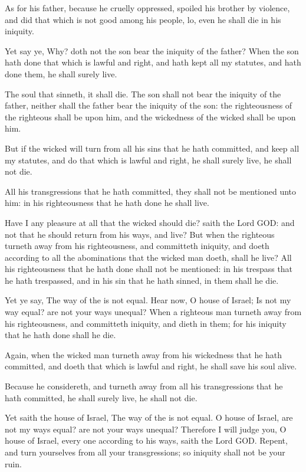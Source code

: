 \Verse As for his father, because he cruelly oppressed, spoiled his brother by violence, and did that which is not good among his people, lo, even he shall die in his iniquity.

\Verse Yet say ye, Why? doth not the son bear the iniquity of the father?  When the son hath done that which is lawful and right, and hath kept all my statutes, and hath done them, he shall surely live.

\Verse The soul that sinneth, it shall die. The son shall not bear the iniquity of the father, neither shall the father bear the iniquity of the son: the righteousness of the righteous shall be upon him, and the wickedness of the wicked shall be upon him.

\Verse But if the wicked will turn from all his sins that he hath committed, and keep all my statutes, and do that which is lawful and right, he shall surely live, he shall not die.

\Verse All his transgressions that he hath committed, they shall not be mentioned unto him: in his righteousness that he hath done he shall live.

\Verse Have I any pleasure at all that the wicked should die? saith the Lord GOD: and not that he should return from his ways, and live?  \Verse But when the righteous turneth away from his righteousness, and committeth iniquity, and doeth according to all the abominations that the wicked man doeth, shall he live? All his righteousness that he hath done shall not be mentioned: in his trespass that he hath trespassed, and in his sin that he hath sinned, in them shall he die.

\Verse Yet ye say, The way of the \LORD is not equal. Hear now, O house of Israel; Is not my way equal? are not your ways unequal?  \Verse When a righteous man turneth away from his righteousness, and committeth iniquity, and dieth in them; for his iniquity that he hath done shall he die.

\Verse Again, when the wicked man turneth away from his wickedness that he hath committed, and doeth that which is lawful and right, he shall save his soul alive.

\Verse Because he considereth, and turneth away from all his transgressions that he hath committed, he shall surely live, he shall not die.

\Verse Yet saith the house of Israel, The way of the \LORD is not equal.  O house of Israel, are not my ways equal? are not your ways unequal?  \Verse Therefore I will judge you, O house of Israel, every one according to his ways, saith the Lord GOD. Repent, and turn yourselves from all your transgressions; so iniquity shall not be your ruin.

